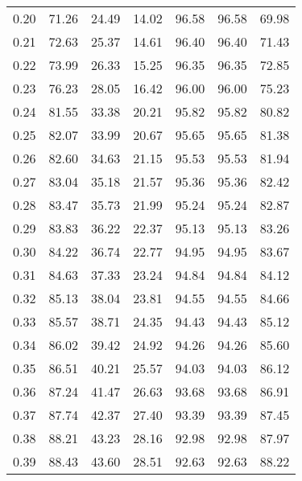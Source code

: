 \begin{tabular}{|c|c|c|c|c|c|c|}
      0.20 &     71.26 &     24.49 &      14.02 &   96.58 &      96.58 &         69.98 \\
      0.21 &     72.63 &     25.37 &      14.61 &   96.40 &      96.40 &         71.43 \\
      0.22 &     73.99 &     26.33 &      15.25 &   96.35 &      96.35 &         72.85 \\
      0.23 &     76.23 &     28.05 &      16.42 &   96.00 &      96.00 &         75.23 \\
      0.24 &     81.55 &     33.38 &      20.21 &   95.82 &      95.82 &         80.82 \\
      0.25 &     82.07 &     33.99 &      20.67 &   95.65 &      95.65 &         81.38 \\
      0.26 &     82.60 &     34.63 &      21.15 &   95.53 &      95.53 &         81.94 \\
      0.27 &     83.04 &     35.18 &      21.57 &   95.36 &      95.36 &         82.42 \\
      0.28 &     83.47 &     35.73 &      21.99 &   95.24 &      95.24 &         82.87 \\
      0.29 &     83.83 &     36.22 &      22.37 &   95.13 &      95.13 &         83.26 \\
      0.30 &     84.22 &     36.74 &      22.77 &   94.95 &      94.95 &         83.67 \\
      0.31 &     84.63 &     37.33 &      23.24 &   94.84 &      94.84 &         84.12 \\
      0.32 &     85.13 &     38.04 &      23.81 &   94.55 &      94.55 &         84.66 \\
      0.33 &     85.57 &     38.71 &      24.35 &   94.43 &      94.43 &         85.12 \\
      0.34 &     86.02 &     39.42 &      24.92 &   94.26 &      94.26 &         85.60 \\
      0.35 &     86.51 &     40.21 &      25.57 &   94.03 &      94.03 &         86.12 \\
      0.36 &     87.24 &     41.47 &      26.63 &   93.68 &      93.68 &         86.91 \\
      0.37 &     87.74 &     42.37 &      27.40 &   93.39 &      93.39 &         87.45 \\
      0.38 &     88.21 &     43.23 &      28.16 &   92.98 &      92.98 &         87.97 \\
      0.39 &     88.43 &     43.60 &      28.51 &   92.63 &      92.63 &         88.22 \\

\end{tabular}
